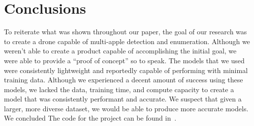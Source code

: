 \section{Conclusions}
To reiterate what was shown throughout our paper, the goal of our research was to create a drone capable of multi-apple detection and enumeration.
Although we weren't able to create a product capable of accomplishing the initial goal, we were able to provide a ``proof of concept'' so to speak.
The models that we used were consistently lightweight and reportedly capable of performing with minimal training data. 
Although we experienced a decent amount of success using these models, we lacked the data, training time, and compute capacity to create a model that was consistently performant and accurate.
We suspect that given a larger, more diverse dataset, we would be able to produce more accurate models. 
We concluded 
The code for the project can be found in~\cite{FruitFly}.
